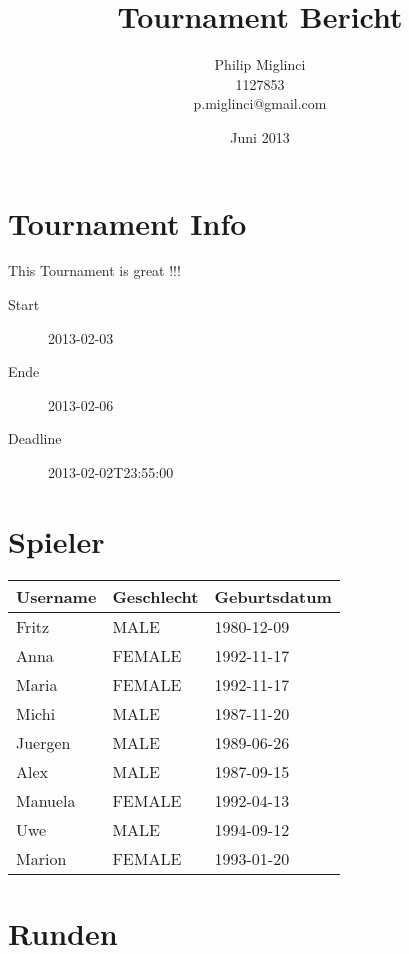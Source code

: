 \documentclass{article}
\begin{document}
\title{Tournament Bericht}
\author{Philip Miglinci\\
 1127853\\
 p.miglinci@gmail.com
}
\date{Juni 2013}
\maketitle

\section{Tournament Info}
  This Tournament is great !!!

\begin{description}
 \item[Start] 2013-02-03
 \item[Ende] 2013-02-06
 \item[Deadline] 2013-02-02T23:55:00
\end{description}

\section{Spieler}

\begin{center}
  \begin{table}[h]
      \begin{tabular}{lll}
        \textbf{Username} & \textbf{Geschlecht} & \textbf{Geburtsdatum} \\
        \hline
    Fritz & MALE & 1980-12-09 \\
  Anna & FEMALE & 1992-11-17 \\
  Maria & FEMALE & 1992-11-17 \\
  Michi & MALE & 1987-11-20 \\
  Juergen & MALE & 1989-06-26 \\
  Alex & MALE & 1987-09-15 \\
  Manuela & FEMALE & 1992-04-13 \\
  Uwe & MALE & 1994-09-12 \\
  Marion & FEMALE & 1993-01-20 \\

      \end{tabular}
  \end{table}
\end{center}

    \section{Runden}
\end{document}
